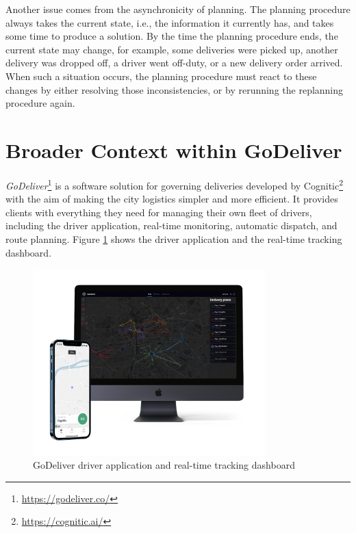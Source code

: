     Another issue comes from the asynchronicity of planning. The planning procedure always takes the current state, i.e., the information it currently has, and takes some time to produce a solution. By the time the planning procedure ends, the current state may change, for example, some deliveries were picked up, another delivery was dropped off, a driver went off-duty, or a new delivery order arrived. When such a situation occurs, the planning procedure must react to these changes by either resolving those inconsistencies, or by rerunning the replanning procedure again.

\section{Broader Context within GoDeliver}

    \emph{GoDeliver}\footnote{\url{https://godeliver.co/}} is a software solution for governing deliveries developed by Cognitic\footnote{\url{https://cognitic.ai/}} with the aim of making the city logistics simpler and more efficient. It provides clients with everything they need for managing their own fleet of drivers, including the driver application, real-time monitoring, automatic dispatch, and route planning. Figure \ref{fig:dashboard} shows the driver application and the real-time tracking dashboard.
    
    \begin{figure}[!ht]
    	\centering
    	\includegraphics[width=0.8\textwidth]{figures/godeliver-system.pdf}
    	\caption[GoDeliver driver application and real-time tracking dashboard]{GoDeliver driver application and real-time tracking dashboard}
    	\label{fig:dashboard}
    \end{figure}

